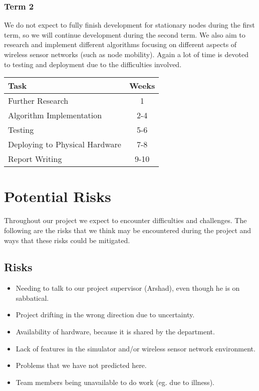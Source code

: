 \documentclass[a4paper]{article}
\begin{document}
\subsubsection{Term 2}

We do not expect to fully finish development for stationary nodes during the first term, so we will continue development during the second term. We also aim to research and implement different algorithms focusing on different aspects of wireless sensor networks (such as node mobility). Again a lot of time is devoted to testing and deployment due to the difficulties involved.

\begin{table}[H]
	\centering
	\begin{tabular}{| l | c |}
	\hline
	\textbf{Task} & \textbf{Weeks}\\
	\hline
	Further Research & 1\\
	\hline
	Algorithm Implementation & 2-4\\
	\hline
	Testing & 5-6\\
	\hline
	Deploying to Physical Hardware & 7-8\\
	\hline
	Report Writing & 9-10\\
	\hline
	\end{tabular}
\end{table}



\section{Potential Risks}

Throughout our project we expect to encounter difficulties and challenges. The following are the risks that we think may be encountered during the project and ways that these risks could be mitigated.


\subsection{Risks}
\begin{itemize}
	\item Needing to talk to our project supervisor (Arshad), even though he is on sabbatical.
	\item Project drifting in the wrong direction due to uncertainty.
	\item Availability of hardware, because it is shared by the department.
	\item Lack of features in the simulator and/or wireless sensor network environment.
	\item Problems that we have not predicted here.
	\item Team members being unavailable to do work (eg. due to illness).
\end{itemize}
\end{document}
